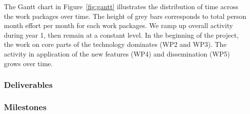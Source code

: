 \ifgrantagreement\else
\wpfigstyle{\def\tabcolsep{3.5pt}}
{\wpfig}
\fi


\pagebreak The Gantt chart in
Figure~\ref{fig:gantt} %
illustrates the distribution of time across the work packages over time.
The height of grey bars corresponds to total person month effort per
month for each work packages. We ramp up overall activity during year 1, then remain
at a constant level. In the beginning of the project, the work on core parts of
the technology dominates (WP2 and WP3). The activity in application of the new features (WP4) and dissemination
(WP5) grows over time. 
\ganttchart[draft,xscale=.4,milestones,yscale=0.9,step=3]


\ifgrantagreement\else
\newpage
\subsubsection{Deliverables}\label{sec:deliverables}
\fi

\subsubsection{Milestones}\label{sec:milestones}









